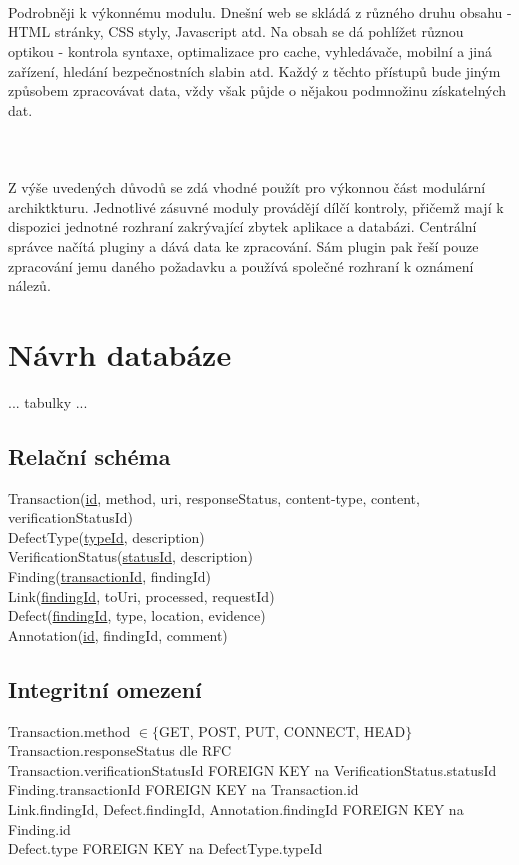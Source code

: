 \documentclass[10pt]{article}
\begin{document}
\paragraph{~}Podrobn\v{e}ji k v\'ykonn\'emu modulu. Dne\v{s}n\'i web se skl\'ad\'a z r\r{u}zn\'eho druhu obsahu - HTML str\'anky, CSS styly, Javascript atd. Na obsah se d\'a pohl\'i\v{z}et r\r{u}znou optikou - kontrola syntaxe, optimalizace pro cache, vyhled\'ava\v{c}e, mobiln\'i a jin\'a za\v{r}\'izen\'i, hled\'an\'i bezpe\v{c}nostn\'ich slabin atd. Ka\v{z}d\'y z t\v{e}chto p\v{r}\'istup\r{u} bude jin\'ym zp\r{u}sobem zpracov\'avat data, v\v{z}dy v\v{s}ak p\r{u}jde o n\v{e}jakou podmno\v{z}inu z\'iskateln\'ych dat. 
\paragraph{~}Z v\'y\v{s}e uveden\'ych d\r{u}vod\r{u} se zd\'a vhodn\'e pou\v{z}\'it pro v\'ykonnou \v{c}\'ast modul\'arn\'i archiktkturu. Jednotliv\'e z\'asuvn\'e moduly prov\'ad\v{e}j\'i d\'il\v{c}\'i kontroly, p\v{r}i\v{c}em\v{z} maj\'i k dispozici jednotn\'e rozhran\'i zakr\'yvaj\'ic\'i zbytek aplikace a datab\'azi. Centr\'aln\'i spr\'avce na\v{c}\'it\'a pluginy a d\'av\'a data ke zpracov\'an\'i. S\'am plugin pak \v{r}e\v{s}\'i pouze zpracov\'an\'i jemu dan\'eho po\v{z}adavku a pou\v{z}\'iv\'a spole\v{c}n\'e rozhran\'i k ozn\'amen\'i n\'alez\r{u}.
\section{N\'avrh datab\'aze}
... tabulky ...

\subsection{Rela\v{c}n\'i sch\'ema}
Transaction(\underline{id}, method, uri, responseStatus, content-type, content, verificationStatusId)\\
DefectType(\underline{typeId}, description)\\
VerificationStatus(\underline{statusId}, description)\\
Finding(\underline{transactionId}, findingId)\\
Link(\underline{findingId}, toUri, processed, requestId)\\
Defect(\underline{findingId}, type, location, evidence)\\
Annotation(\underline{id}, findingId, comment)\\
\subsection{Integritn\'i omezen\'i}
Transaction.method $\in \{$GET, POST, PUT, CONNECT, HEAD$\}$\\
Transaction.responseStatus dle RFC\\
Transaction.verificationStatusId FOREIGN KEY na VerificationStatus.statusId\\
Finding.transactionId FOREIGN KEY na Transaction.id\\
Link.findingId, Defect.findingId, Annotation.findingId FOREIGN KEY na Finding.id\\
Defect.type FOREIGN KEY na DefectType.typeId\\
\end{document}
